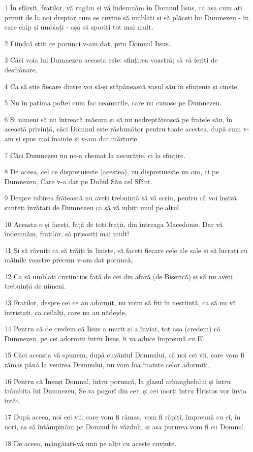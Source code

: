 \par 1 În sfârșit, fraților, vă rugăm și vă îndemnăm în Domnul Iisus, ca așa cum ați primit de la noi dreptar cum se cuvine să umblați și să plăceți lui Dumnezeu - în care chip și umblați - așa să sporiți tot mai mult.
\par 2 Fiindcă știți ce porunci v-am dat, prin Domnul Iisus.
\par 3 Căci voia lui Dumnezeu aceasta este: sfințirea voastră; să vă feriți de desfrânare,
\par 4 Ca să știe fiecare dintre voi să-și stăpânească vasul său în sfințenie și cinste,
\par 5 Nu în patima poftei cum fac neamurile, care nu cunosc pe Dumnezeu.
\par 6 Și nimeni să nu întreacă măsura și să nu nedreptățească pe fratele său, în această privință, căci Domnul este răzbunător pentru toate acestea, după cum v-am și spus mai înainte și v-am dat mărturie.
\par 7 Căci Dumnezeu nu ne-a chemat la necurăție, ci la sfințire.
\par 8 De aceea, cel ce disprețuiește (acestea), nu disprețuiește un om, ci pe Dumnezeu, Care v-a dat pe Duhul Său cel Sfânt.
\par 9 Despre iubirea frățească nu aveți trebuință să vă scriu, pentru că voi înșivă sunteți învățați de Dumnezeu ca să vă iubiți unul pe altul.
\par 10 Aceasta o și faceți, față de toți frații, din întreaga Macedonie. Dar vă îndemnăm, fraților, să prisosiți mai mult!
\par 11 Și să râvniți ca să trăiți în liniște, să faceți fiecare cele ale sale și să lucrați cu mâinile voastre precum v-am dat poruncă,
\par 12 Ca să umblați cuviincios față de cei din afară (de Biserică) și să nu aveți trebuință de nimeni.
\par 13 Fraților, despre cei ce au adormit, nu voim să fiți în neștiință, ca să nu vă întristați, ca ceilalți, care nu au nădejde,
\par 14 Pentru că de credem că Iisus a murit și a înviat, tot așa (credem) că Dumnezeu, pe cei adormiți întru Iisus, îi va aduce împreună cu El.
\par 15 Căci aceasta vă spunem, după cuvântul Domnului, că noi cei vii, care vom fi rămas până la venirea Domnului, nu vom lua înainte celor adormiți,
\par 16 Pentru că Însuși Domnul, întru poruncă, la glasul arhanghelului și întru trâmbița lui Dumnezeu, Se va pogorî din cer, și cei morți întru Hristos vor învia întâi,
\par 17 După aceea, noi cei vii, care vom fi rămas, vom fi răpiți, împreună cu ei, în nori, ca să întâmpinăm pe Domnul în văzduh, și așa pururea vom fi cu Domnul.
\par 18 De aceea, mângâiați-vă unii pe alții cu aceste cuvinte.

